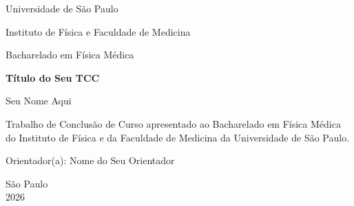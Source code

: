 \documentclass[
  12pt,
  a4paper,
  oneside
]{report}
\title{\tcctitulo}
\author{\tccautor}
\date{2026}
\newcommand{\tccautor}{Seu Nome Aqui}
\newcommand{\tcctitulo}{Título do Seu TCC}
\newcommand{\tccorientador}{Nome do Seu Orientador}
\begin{document}

\begin{titlepage}
  \centering

  {\large Universidade de São Paulo\par}
  {\large Instituto de Física e Faculdade de Medicina\par}
  {\large Bacharelado em Física Médica\par}

  \vfill

  {\Large\bfseries
  \tcctitulo
  \par}

  \vspace{2cm}

  {\large \tccautor\par}

  \vfill

  \begin{flushright}
    \begin{minipage}{0.55\textwidth}
      Trabalho de Conclusão de Curso apresentado ao Bacharelado em Física Médica do Instituto de Física e da Faculdade de Medicina da Universidade de São Paulo.

      \vspace{0.75cm}

      Orientador(a): \tccorientador
    \end{minipage}
  \end{flushright}

  \vfill

  {\large São Paulo\\2026\par}
\end{titlepage}

\tableofcontents
\clearpage











\printbibliography[heading=bibintoc,title={Referências}]
\end{document}
